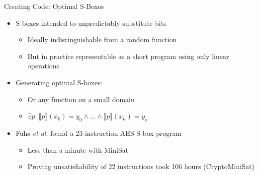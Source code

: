 \documentclass[ignorenonframetext,]{beamer}
\providecommand{\tightlist}{%
  \setlength{\itemsep}{0pt}\setlength{\parskip}{0pt}}
\begin{document}
\begin{frame}{Creating Code: Optimal S-Boxes}

\begin{itemize}
\tightlist
\item
  S-boxes intended to unpredictably substitute bits

  \begin{itemize}
  \tightlist
  \item
    Ideally indistinguishable from a random function
  \item
    But in practice representable as a short program using only linear
    operations
  \end{itemize}
\item
  Generating optimal S-boxes:

  \begin{itemize}
  \tightlist
  \item
    Or any function on a small domain
  \item
    \(\exists p.~\llbracket{}p\rrbracket{}(x_{0}) = y_{0} \wedge \dots \wedge  \llbracket{}p\rrbracket{}(x_{n}) = y_{n}\)
  \end{itemize}
\item
  Fuhs \emph{et al.} found a 23-instruction AES S-box program
  \cite{fuhs2010sbox}

  \begin{itemize}
  \tightlist
  \item
    Less than a minute with MiniSat
  \item
    Proving unsatisfiability of 22 instructions took 106 hours
    (CryptoMiniSat)
  \end{itemize}
\end{itemize}

\end{frame}
\end{document}
